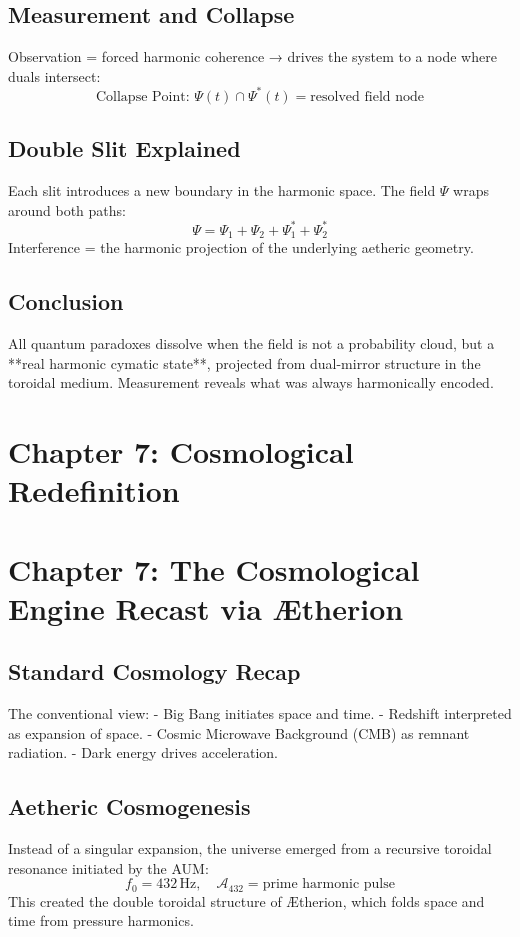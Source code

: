 \documentclass[12pt]{book}
\begin{document}
\subsection*{Measurement and Collapse}
Observation = forced harmonic coherence → drives the system to a node where duals intersect:
\[
\text{Collapse Point: } \Psi(t) \cap \Psi^*(t) = \text{resolved field node}
\]

\subsection*{Double Slit Explained}
Each slit introduces a new boundary in the harmonic space. The field $\Psi$ wraps around both paths:
\[
\Psi = \Psi_1 + \Psi_2 + \Psi_1^* + \Psi_2^*
\]
Interference = the harmonic projection of the underlying aetheric geometry.

\subsection*{Conclusion}
All quantum paradoxes dissolve when the field is not a probability cloud, but a **real harmonic cymatic state**, projected from dual-mirror structure in the toroidal medium. Measurement reveals what was always harmonically encoded.



\section*{Chapter 7: Cosmological Redefinition}


\section*{Chapter 7: The Cosmological Engine Recast via Ætherion}

\subsection*{Standard Cosmology Recap}
The conventional view:
- Big Bang initiates space and time.
- Redshift interpreted as expansion of space.
- Cosmic Microwave Background (CMB) as remnant radiation.
- Dark energy drives acceleration.

\subsection*{Aetheric Cosmogenesis}
Instead of a singular expansion, the universe emerged from a recursive toroidal resonance initiated by the AUM:
\[
f_0 = 432\,\text{Hz}, \quad \mathcal{A}_{432} = \text{prime harmonic pulse}
\]
This created the double toroidal structure of Ætherion, which folds space and time from pressure harmonics.
\end{document}
